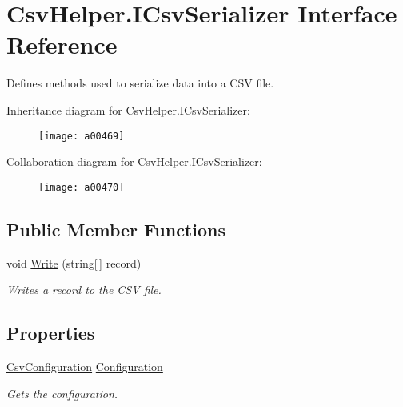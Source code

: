 \hypertarget{a00118}{\section{Csv\-Helper.\-I\-Csv\-Serializer Interface Reference}
\label{a00118}
}


Defines methods used to serialize data into a C\-S\-V file.  




Inheritance diagram for Csv\-Helper.\-I\-Csv\-Serializer\-:
\nopagebreak
\begin{figure}[H]
\begin{center}
\leavevmode
\texttt{[image: a00469]}
\end{center}
\end{figure}


Collaboration diagram for Csv\-Helper.\-I\-Csv\-Serializer\-:
\nopagebreak
\begin{figure}[H]
\begin{center}
\leavevmode
\texttt{[image: a00470]}
\end{center}
\end{figure}
\subsection*{Public Member Functions}
\begin{DoxyCompactItemize}
\item 
void \hyperlink{a00118_a0b442858eef85b7d933662359646fd0b}{Write} (string\mbox{[}$\,$\mbox{]} record)
\begin{DoxyCompactList}\small\item\em Writes a record to the C\-S\-V file. \end{DoxyCompactList}\end{DoxyCompactItemize}
\subsection*{Properties}
\begin{DoxyCompactItemize}
\item 
\hyperlink{a00065}{Csv\-Configuration} \hyperlink{a00118_a54d241fe87517707b6f85c30fe8b3a95}{Configuration}
\begin{DoxyCompactList}\small\item\em Gets the configuration. \end{DoxyCompactList}\end{DoxyCompactItemize}


